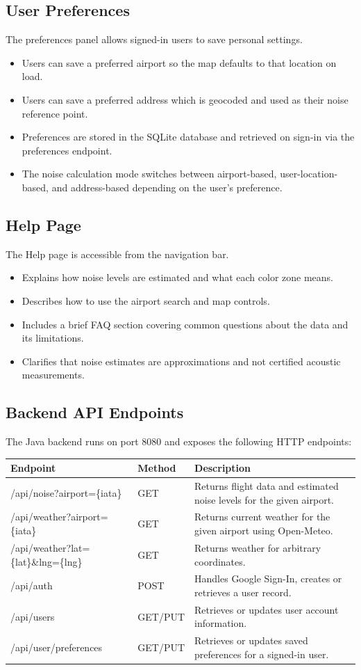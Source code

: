 \documentclass[12pt]{article}
\begin{document}
\subsection{User Preferences}
The preferences panel allows signed-in users to save personal settings.

\begin{itemize}
\item Users can save a preferred airport so the map defaults to that location on load.
\item Users can save a preferred address which is geocoded and used as their noise reference point.
\item Preferences are stored in the SQLite database and retrieved on sign-in via the preferences endpoint.
\item The noise calculation mode switches between airport-based, user-location-based, and address-based depending on the user's preference.
\end{itemize}

\subsection{Help Page}
The Help page is accessible from the navigation bar.

\begin{itemize}
\item Explains how noise levels are estimated and what each color zone means.
\item Describes how to use the airport search and map controls.
\item Includes a brief FAQ section covering common questions about the data and its limitations.
\item Clarifies that noise estimates are approximations and not certified acoustic measurements.
\end{itemize}

\subsection{Backend API Endpoints}
The Java backend runs on port 8080 and exposes the following HTTP endpoints:

\begin{tabular}{|l|l|p{6cm}|}
\hline
Endpoint & Method & Description \\
\hline
/api/noise?airport=\{iata\} & GET & Returns flight data and estimated noise levels for the given airport. \\
\hline
/api/weather?airport=\{iata\} & GET & Returns current weather for the given airport using Open-Meteo. \\
\hline
/api/weather?lat=\{lat\}\&lng=\{lng\} & GET & Returns weather for arbitrary coordinates. \\
\hline
/api/auth & POST & Handles Google Sign-In, creates or retrieves a user record. \\
\hline
/api/users & GET/PUT & Retrieves or updates user account information. \\
\hline
/api/user/preferences & GET/PUT & Retrieves or updates saved preferences for a signed-in user. \\
\hline
\end{tabular}
\end{document}
